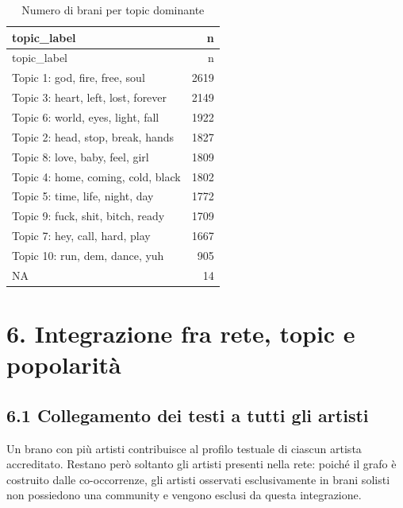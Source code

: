 \documentclass[
]{article}
\begin{document}
\begin{longtable}[]{@{}lr@{}}
\caption{Numero di brani per topic dominante}\tabularnewline
\toprule\noalign{}
topic\_label & n \\
\midrule\noalign{}
\endfirsthead
\toprule\noalign{}
topic\_label & n \\
\midrule\noalign{}
\endhead
\bottomrule\noalign{}
\endlastfoot
Topic 1: god, fire, free, soul & 2619 \\
Topic 3: heart, left, lost, forever & 2149 \\
Topic 6: world, eyes, light, fall & 1922 \\
Topic 2: head, stop, break, hands & 1827 \\
Topic 8: love, baby, feel, girl & 1809 \\
Topic 4: home, coming, cold, black & 1802 \\
Topic 5: time, life, night, day & 1772 \\
Topic 9: fuck, shit, bitch, ready & 1709 \\
Topic 7: hey, call, hard, play & 1667 \\
Topic 10: run, dem, dance, yuh & 905 \\
NA & 14 \\
\end{longtable}

\section{6. Integrazione fra rete, topic e
popolarità}\label{integrazione-fra-rete-topic-e-popolarituxe0}

\subsection{6.1 Collegamento dei testi a tutti gli
artisti}\label{collegamento-dei-testi-a-tutti-gli-artisti}

Un brano con più artisti contribuisce al profilo testuale di ciascun
artista accreditato. Restano però soltanto gli artisti presenti nella
rete: poiché il grafo è costruito dalle co-occorrenze, gli artisti
osservati esclusivamente in brani solisti non possiedono una community e
vengono esclusi da questa integrazione.
\end{document}
